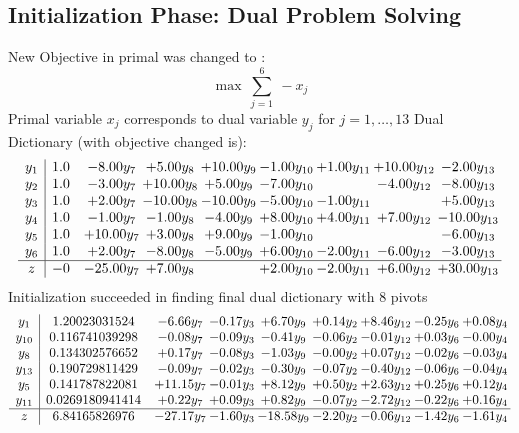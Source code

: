 \documentclass[8pt]{article}
\begin{document}
\subsection{Initialization Phase: Dual Problem Solving}
New Objective in primal was changed to : \[ \max\ \sum_{j=1}^{6}\ - x_j \] 
Primal variable $x_j$ corresponds to dual variable $y_j$ for $j = 1,\ldots,13$
Dual Dictionary (with objective changed is): 
\[\begin{array}{c| c c@{\hskip 2pt} c@{\hskip 2pt} c@{\hskip 2pt} c@{\hskip 2pt} c@{\hskip 2pt} c@{\hskip 2pt} c@{\hskip 2pt} }
 y_{1}   &  1.0 & -8.00 y_{7} & +  5.00 y_{8} & + 10.00 y_{9} & -1.00 y_{10} & +  1.00 y_{11} & + 10.00 y_{12} & -2.00 y_{13}\\
 y_{2}   &  1.0 & -3.00 y_{7} & + 10.00 y_{8} & +  5.00 y_{9} & -7.00 y_{10} &   & -4.00 y_{12} & -8.00 y_{13}\\
 y_{3}   &  1.0 & +  2.00 y_{7} & -10.00 y_{8} & -10.00 y_{9} & -5.00 y_{10} & -1.00 y_{11} &   & +  5.00 y_{13}\\
 y_{4}   &  1.0 & -1.00 y_{7} & -1.00 y_{8} & -4.00 y_{9} & +  8.00 y_{10} & +  4.00 y_{11} & +  7.00 y_{12} & -10.00 y_{13}\\
 y_{5}   &  1.0 & + 10.00 y_{7} & +  3.00 y_{8} & +  9.00 y_{9} & -1.00 y_{10} &    &   & -6.00 y_{13}\\
 y_{6}   &  1.0 & +  2.00 y_{7} & -8.00 y_{8} & -5.00 y_{9} & +  6.00 y_{10} & -2.00 y_{11} & -6.00 y_{12} & -3.00 y_{13}\\
\hline
z    &  -0 & -25.00 y_{7} & +  7.00 y_{8} &   & +  2.00 y_{10} & -2.00 y_{11} & +  6.00 y_{12} & + 30.00 y_{13}\\
\end{array}\]
Initialization succeeded in finding final dual dictionary with 8 pivots
\[\begin{array}{c| c c@{\hskip 2pt} c@{\hskip 2pt} c@{\hskip 2pt} c@{\hskip 2pt} c@{\hskip 2pt} c@{\hskip 2pt} c@{\hskip 2pt} }
 y_{1}   &  1.20023031524 & -6.66 y_{7} & -0.17 y_{3} & +  6.70 y_{9} & +  0.14 y_{2} & +  8.46 y_{12} & -0.25 y_{6} & +  0.08 y_{4}\\
 y_{10}   &  0.116741039298 & -0.08 y_{7} & -0.09 y_{3} & -0.41 y_{9} & -0.06 y_{2} & -0.01 y_{12} & +  0.03 y_{6} & -0.00 y_{4}\\
 y_{8}   &  0.134302576652 & +  0.17 y_{7} & -0.08 y_{3} & -1.03 y_{9} & -0.00 y_{2} & +  0.07 y_{12} & -0.02 y_{6} & -0.03 y_{4}\\
 y_{13}   &  0.190729811429 & -0.09 y_{7} & -0.02 y_{3} & -0.30 y_{9} & -0.07 y_{2} & -0.40 y_{12} & -0.06 y_{6} & -0.04 y_{4}\\
 y_{5}   &  0.141787822081 & + 11.15 y_{7} & -0.01 y_{3} & +  8.12 y_{9} & +  0.50 y_{2} & +  2.63 y_{12} & +  0.25 y_{6} & +  0.12 y_{4}\\
 y_{11}   &  0.0269180941414 & +  0.22 y_{7} & +  0.09 y_{3} & +  0.82 y_{9} & -0.07 y_{2} & -2.72 y_{12} & -0.22 y_{6} & +  0.16 y_{4}\\
\hline
z    &  6.84165826976 & -27.17 y_{7} & -1.60 y_{3} & -18.58 y_{9} & -2.20 y_{2} & -0.06 y_{12} & -1.42 y_{6} & -1.61 y_{4}\\
\end{array}\]
\end{document}
